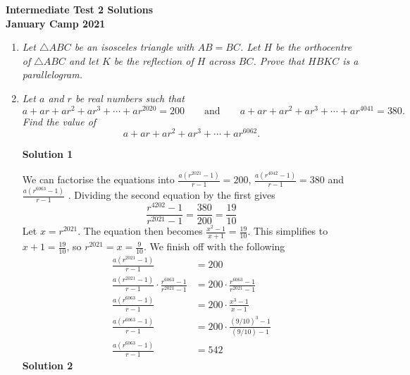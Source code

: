 \documentclass{article}
\begin{document}
\thispagestyle{empty}

\begin{center}
  \textbf{\Large Intermediate Test 2 Solutions}
  \\ \vspace{1em}
  \textbf{\large January Camp 2021}
\end{center}

\vspace{24pt}

\begin{enumerate}[1.]

  \item %
  {\itshape Let $\triangle ABC$ be an isosceles triangle with $AB = BC$. Let $H$ be the orthocentre of $\triangle ABC$ and let $K$ be the reflection of $H$ across $BC$. Prove that $HBKC$ is a parallelogram.}
  
  
  \item %
  {\itshape Let $a$ and $r$ be real numbers such that
  \[ a +ar +ar^2 +ar^3 +\dotsb +ar^{2020} = 200 \qquad\text{and}\qquad a +ar +ar^2 +ar^3 +\dotsb +ar^{4041} = 380. \]
  Find the value of
  \[ a +ar +ar^2 +ar^3 +\dotsb +ar^{6062}. \]}
  
  \textbf{Solution 1}\newline

We can factorise the equations into $\frac{a(r^{2021} - 1)}{r - 1} = 200$, $\frac{a(r^{4042} - 1)}{r - 1} = 380$ and $\frac{a(r^{6063} - 1)}{r - 1}$ . Dividing the second equation by the first gives $$\frac{r^{4202} - 1}{r^{2021} - 1} = \frac{380}{200} = \frac{19}{10}$$ Let $x = r^{2021}$. The equation then becomes $\frac{x^2 - 1}{x + 1} = \frac{19}{10}$. This simplifies to $x + 1 = \frac{19}{10}$, so $r^{2021} = x = \frac{9}{10}$. We finish off with the following
\begin{align*}
\frac{a(r^{2021} - 1)}{r - 1} &= 200\\
\frac{a(r^{2021} - 1)}{r - 1}\cdot \frac{r^{6063} - 1}{r^{2021} - 1} &= 200\cdot \frac{r^{6063} - 1}{r^{2021} - 1}\\
\frac{a(r^{6063} - 1)}{r - 1} &= 200 \cdot \frac{x^3 - 1}{x - 1}\\
\frac{a(r^{6063} - 1)}{r - 1} &= 200 \cdot \frac{(9/10)^3 - 1}{(9/10) - 1}\\
\frac{a(r^{6063} - 1)}{r - 1} &= 542
\end{align*}
\textbf{Solution 2}\newline


\end{enumerate}
\end{document}
